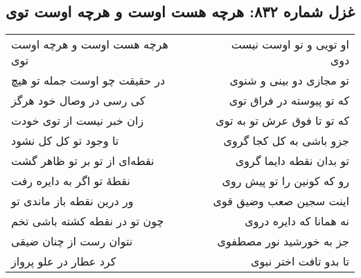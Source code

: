 \begin{center}
\section*{غزل شماره ۸۳۲: هرچه هست اوست و هرچه اوست توی}
\label{sec:832}
\begin{longtable}{l p{0.5cm} r}
هرچه هست اوست و هرچه اوست توی
&&
او تویی و تو اوست نیست دوی
\\
در حقیقت چو اوست جمله تو هیچ
&&
تو مجازی دو بینی و شنوی
\\
کی رسی در وصال خود هرگز
&&
که تو پیوسته در فراق توی
\\
زان خبر نیست از توی خودت
&&
که تو تا فوق عرش تو به توی
\\
تا وجود تو کل کل نشود
&&
جزو باشی به کل کجا گروی
\\
نقطه‌ای از تو بر تو ظاهر گشت
&&
تو بدان نقطه دایما گروی
\\
نقطهٔ تو اگر به دایره رفت
&&
رو که کونین را تو پیش روی
\\
ور درین نقطه باز ماندی تو
&&
اینت سجین صعب وضیق قوی
\\
چون تو در نقطه کشته باشی تخم
&&
نه همانا که دایره دروی
\\
نتوان رست از چنان ضیقی
&&
جز به خورشید نور مصطفوی
\\
کرد عطار در علو پرواز
&&
تا بدو تافت اختر نبوی
\\
\end{longtable}
\end{center}
